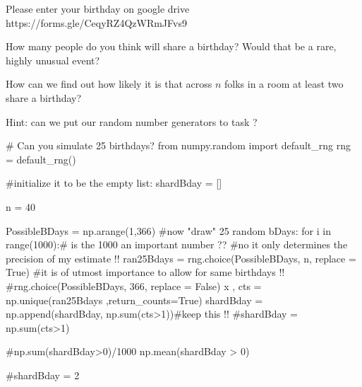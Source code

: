 \documentclass[
  letterpaper,
  DIV=11,
  numbers=noendperiod]{scrreprt}
\newenvironment{Shaded}{\begin{snugshade}}{\end{snugshade}}
\newcommand{\BuiltInTok}[1]{\textcolor[rgb]{0.00,0.23,0.31}{#1}}
\newcommand{\CommentTok}[1]{\textcolor[rgb]{0.37,0.37,0.37}{#1}}
\newcommand{\ControlFlowTok}[1]{\textcolor[rgb]{0.00,0.23,0.31}{#1}}
\newcommand{\DecValTok}[1]{\textcolor[rgb]{0.68,0.00,0.00}{#1}}
\newcommand{\ImportTok}[1]{\textcolor[rgb]{0.00,0.46,0.62}{#1}}
\newcommand{\KeywordTok}[1]{\textcolor[rgb]{0.00,0.23,0.31}{#1}}
\newcommand{\NormalTok}[1]{\textcolor[rgb]{0.00,0.23,0.31}{#1}}
\newcommand{\OperatorTok}[1]{\textcolor[rgb]{0.37,0.37,0.37}{#1}}
\newcommand{\VariableTok}[1]{\textcolor[rgb]{0.07,0.07,0.07}{#1}}
\begin{document}
Please enter your birthday on google drive
https://forms.gle/CeqyRZ4QzWRmJFvs9

How many people do you think will share a birthday? Would that be a
rare, highly unusual event?

How can we find out how likely it is that across \(n\) folks in a room
at least two share a birthday?

Hint: can we put our random number generators to task ?

\begin{Shaded}
\begin{Highlighting}[]
\CommentTok{\# Can you simulate 25 birthdays?}
\ImportTok{from}\NormalTok{ numpy.random }\ImportTok{import}\NormalTok{ default\_rng }
\NormalTok{rng }\OperatorTok{=}\NormalTok{ default\_rng()}


\CommentTok{\#initialize it to be the empty list:}
\NormalTok{shardBday }\OperatorTok{=}\NormalTok{ []}

\NormalTok{n }\OperatorTok{=} \DecValTok{40}

\NormalTok{PossibleBDays }\OperatorTok{=}\NormalTok{ np.arange(}\DecValTok{1}\NormalTok{,}\DecValTok{366}\NormalTok{)}
\CommentTok{\#now "draw" 25 random bDays:}
\ControlFlowTok{for}\NormalTok{ i }\KeywordTok{in} \BuiltInTok{range}\NormalTok{(}\DecValTok{1000}\NormalTok{):}\CommentTok{\# is the 1000 an important number ??}
\CommentTok{\#no it only determines the precision of my estimate !!}
\NormalTok{  ran25Bdays }\OperatorTok{=}\NormalTok{ rng.choice(PossibleBDays, n, replace }\OperatorTok{=} \VariableTok{True}\NormalTok{)}
  \CommentTok{\#it is of utmost importance to allow for same birthdays !! }
  \CommentTok{\#rng.choice(PossibleBDays, 366, replace = False)}
\NormalTok{  x , cts }\OperatorTok{=}\NormalTok{ np.unique(ran25Bdays ,return\_counts}\OperatorTok{=}\VariableTok{True}\NormalTok{)}
\NormalTok{  shardBday }\OperatorTok{=}\NormalTok{ np.append(shardBday, np.}\BuiltInTok{sum}\NormalTok{(cts}\OperatorTok{\textgreater{}}\DecValTok{1}\NormalTok{))}\CommentTok{\#keep this !!}
  \CommentTok{\#shardBday = np.sum(cts\textgreater{}1)}
\end{Highlighting}
\end{Shaded}

\begin{Shaded}
\begin{Highlighting}[]
\CommentTok{\#np.sum(shardBday\textgreater{}0)/1000}
\NormalTok{np.mean(shardBday }\OperatorTok{\textgreater{}} \DecValTok{0}\NormalTok{)}

\CommentTok{\#shardBday = 2}
\end{Highlighting}
\end{Shaded}
\end{document}
